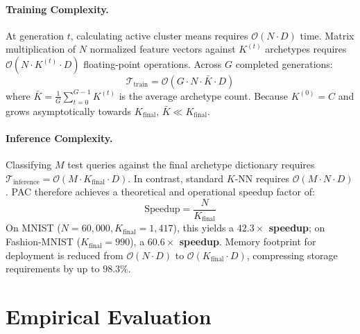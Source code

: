 \documentclass[11pt,a4paper]{article}
\begin{document}
\paragraph{Training Complexity.} At generation $t$, calculating active cluster means requires $\mathcal{O}(N \cdot D)$ time. Matrix multiplication of $N$ normalized feature vectors against $K^{(t)}$ archetypes requires $\mathcal{O}(N \cdot K^{(t)} \cdot D)$ floating-point operations. Across $G$ completed generations:
\begin{equation}
    \mathcal{T}_{\text{train}} = \mathcal{O}\left(G \cdot N \cdot \bar{K} \cdot D\right)
\end{equation}
where $\bar{K} = \frac{1}{G} \sum_{t=0}^{G-1} K^{(t)}$ is the average archetype count. Because $K^{(0)} = C$ and grows asymptotically towards $K_{\text{final}}$, $\bar{K} \ll K_{\text{final}}$.

\paragraph{Inference Complexity.} Classifying $M$ test queries against the final archetype dictionary requires $\mathcal{T}_{\text{inference}} = \mathcal{O}\left(M \cdot K_{\text{final}} \cdot D\right)$. In contrast, standard $K$-NN requires $\mathcal{O}(M \cdot N \cdot D)$. PAC therefore achieves a theoretical and operational speedup factor of:
\begin{equation}
    \text{Speedup} = \frac{N}{K_{\text{final}}}
\end{equation}
On MNIST ($N=60,000, K_{\text{final}}=1,417$), this yields a \textbf{$42.3\times$ speedup}; on Fashion-MNIST ($K_{\text{final}}=990$), a \textbf{$60.6\times$ speedup}. Memory footprint for deployment is reduced from $\mathcal{O}(N \cdot D)$ to $\mathcal{O}(K_{\text{final}} \cdot D)$, compressing storage requirements by up to $98.3\%$.

\section{Empirical Evaluation}
\label{sec:eval}
\end{document}
